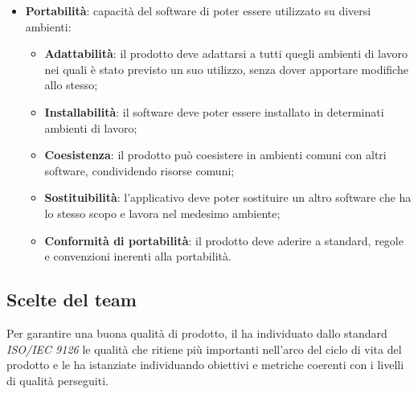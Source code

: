\begin{itemize}
	\item\textbf{Portabilità}: capacità del software di poter essere utilizzato su diversi ambienti:
	\begin{itemize}
		\item\textbf{Adattabilità}: il prodotto deve adattarsi a tutti quegli ambienti di lavoro nei quali è stato previsto un suo utilizzo, senza dover apportare modifiche allo stesso;
		\item\textbf{Installabilità}: il software deve poter essere installato in determinati ambienti di lavoro;
		\item\textbf{Coesistenza}: il prodotto può coesistere in ambienti comuni
con altri software, condividendo risorse comuni;
		\item\textbf{Sostituibilità}: l'applicativo deve poter sostituire un altro software che ha lo stesso scopo e lavora nel medesimo ambiente;
		\item\textbf{Conformità di portabilità}: il prodotto deve aderire a standard, regole e convenzioni inerenti alla portabilità.
	\end{itemize}
\end{itemize}

\subsection{Scelte del team}
Per garantire una buona qualità di prodotto, il  ha individuato dallo standard \textit{ISO/IEC 9126} le qualità che ritiene più importanti nell'arco del ciclo di vita del prodotto e le ha istanziate individuando obiettivi e metriche coerenti con i livelli di qualità perseguiti.

\newpage